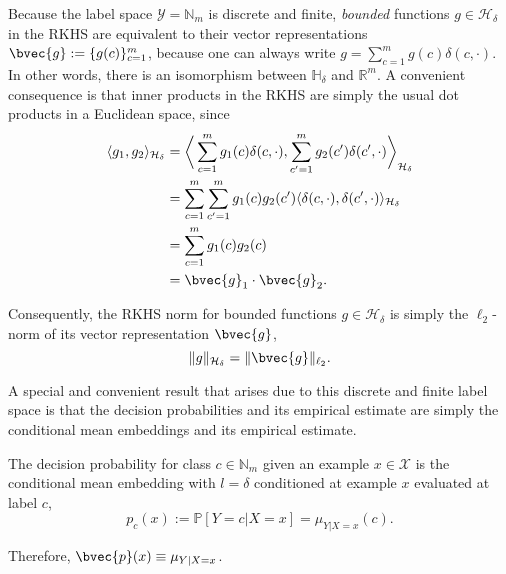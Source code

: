 \documentclass[runningheads, envcountsame, a4paper]{llncs}
\begin{document}
		Because the label space $\mathcal{Y} = \mathbb{N}_{m}$ is discrete and finite, \textit{bounded} functions $g \in \mathcal{H}_{\delta}$ in the \gls{RKHS} are equivalent to their vector representations $\bvec{g} := \{g(c)\}_{c = 1}^{m}$, because one can always write $g = \sum_{c = 1}^{m} g(c) \delta(c, \cdot)$. In other words, there is an isomorphism between $\mathbb{H}_{\delta}$ and $\mathbb{R}^{m}$. A convenient consequence is that inner products in the \gls{RKHS} are simply the usual dot products in a Euclidean space, since
		\begin{equation}
		\begin{aligned}
			\langle g_{1}, g_{2} \rangle_{\mathcal{H}_{\delta}} &= \bigg\langle \sum_{c = 1}^{m} g_{1}(c) \delta(c, \cdot), \sum_{c' = 1}^{m} g_{2}(c') \delta(c', \cdot)  \bigg\rangle_{\mathcal{H}_{\delta}} \\
			&= \sum_{c = 1}^{m} \sum_{c' = 1}^{m} g_{1}(c) g_{2}(c') \langle \delta(c, \cdot), \delta(c', \cdot) \rangle_{\mathcal{H}_{\delta}} \\
			&= \sum_{c = 1}^{m} g_{1}(c) g_{2}(c) \\
			&= \bvec{g}_{1} \cdot \bvec{g}_{2}.
		\end{aligned}
		\end{equation}
	
		Consequently, the \gls{RKHS} norm for bounded functions $g \in \mathcal{H}_{\delta}$ is simply the $\ell_{2}$-norm of its vector representation $\bvec{g}$,
		\begin{equation}
			\lVert g \rVert_{\mathcal{H}_{\delta}} = \lVert \bvec{g} \rVert_{\ell_{2}}.
		\label{eq:RKHS_norm_is_l2_norm}
		\end{equation}
		
		A special and convenient result that arises due to this discrete and finite label space is that the decision probabilities and its empirical estimate are simply the conditional mean embeddings and its empirical estimate.
		
		\begin{lemma}
			\label{thm:probability_is_embedding}
			The decision probability for class $c \in \mathbb{N}_{m}$ given an example $x \in \mathcal{X}$ is the conditional mean embedding with $l = \delta$ conditioned at example $x$ evaluated at label $c$,
			\begin{equation}
				p_{c}(x) := \mathbb{P}[Y = c | X = x] = \mu_{Y | X = x}(c).
			\end{equation}
			
			Therefore, $\bvec{p}(x) \equiv \mu_{Y | X = x}$.
		\end{lemma}
	
\end{document}
